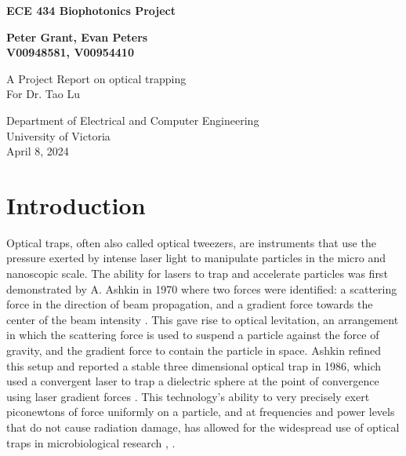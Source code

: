 \documentclass{article}
\begin{document}
\begin{titlepage}
    \begin{center}
        \vspace*{2cm}
 
        \huge
        \textbf{ECE 434 Biophotonics Project}
     
        \vspace{1.5cm}
        \Large
        \textbf{Peter Grant, Evan Peters\\
        V00948581, V00954410}
 
        \vfill
             
        A Project Report on optical trapping\\
        For Dr. Tao Lu     

        \vspace{0.8cm}
      

             
        Department of Electrical and Computer Engineering\\
        University of Victoria\\
        April 8, 2024
             
    \end{center}
\end{titlepage}


\tableofcontents
\newpage

\section*{Introduction}

Optical traps, often also called optical tweezers, are instruments that use the pressure exerted by intense laser light to manipulate particles in the micro and nanoscopic scale. The ability for lasers to trap and accelerate particles was first demonstrated by A. Ashkin in 1970 where two forces were identified: a scattering force in the direction of beam propagation, and a gradient force towards the center of the beam intensity \cite{PhysRevLett.24.156}. This gave rise to optical levitation, an arrangement in which the scattering force is used to suspend a particle against the force of gravity, and the gradient force to contain the particle in space. Ashkin refined this setup and reported a stable three dimensional optical trap in 1986, which used a convergent laser to trap a dielectric sphere at the point of convergence using laser gradient forces \cite{Ashkin:86}. This technology's ability to very precisely exert piconewtons of force uniformly on a particle, and at frequencies and power levels that do not cause radiation damage, has allowed for the widespread use of optical traps in microbiological research \cite{Bustamante2021}, \cite{Lang2003-ll}.
\end{document}

